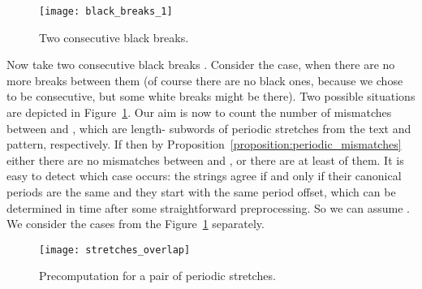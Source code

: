 \documentclass[runningheads]{llncs}
\begin{document}
\begin{figure}[t]
\texttt{[image: black\_breaks\_1]}
\caption{Two consecutive black breaks.}
\label{figure:black_breaks_1}
\end{figure}

Now take two consecutive black breaks . Consider the case, when there are no more breaks between them (of course there are no black ones, because we chose  to be consecutive, but some white breaks might be there). Two possible situations are depicted in Figure~\ref{figure:black_breaks_1}. 
Our aim is now to count the number of mismatches between  and , which are length- subwords of periodic stretches from the text and pattern, respectively. If  then by Proposition~\ref{proposition:periodic_mismatches} either there are no mismatches between  and , or there are at least  of them. It is easy to detect which case occurs: the strings agree if and only if their canonical periods are the same and they start with the same period offset, which can be determined in  time after some straightforward preprocessing. So we can assume . We consider the cases from the Figure~\ref{figure:black_breaks_1} separately.

\begin{figure}[t]
\centering
\texttt{[image: stretches\_overlap]}
\caption{Precomputation for a pair of periodic stretches.}
\label{figure:stretches_overlap}
\end{figure}
\end{document}
